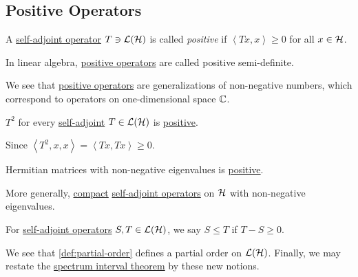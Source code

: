 \subsection{Positive Operators}
\begin{definition}\label{def:positive-op}
	A \hyperref[def:self-adjoint-op]{self-adjoint operator} \(T\ni \mathcal{\MakeUppercase{l}} (\mathcal{\MakeUppercase{h}} )\) is called \emph{positive} if \(\left\langle Tx, x \right\rangle \geq 0\) for all \(x\in \mathcal{\MakeUppercase{H}} \).
\end{definition}

\begin{remark}
	In linear algebra, \hyperref[def:positive-op]{positive operators} are called positive semi-definite.
\end{remark}

We see that \hyperref[def:positive-op]{positive operators} are generalizations of non-negative numbers, which correspond to operators on one-dimensional space \(\mathbb{\MakeUppercase{c}} \).

\begin{eg}
	\(T^2\) for every \hyperref[def:self-adjoint-op]{self-adjoint} \(T\in \mathcal{\MakeUppercase{l}} (\mathcal{\MakeUppercase{h}} )\) is \hyperref[def:positive-op]{positive}.
\end{eg}
\begin{explanation}
	Since \(\left\langle T^2, x, x \right\rangle = \left\langle Tx, Tx \right\rangle \geq 0\).
\end{explanation}

\begin{eg}
	Hermitian matrices with non-negative eigenvalues is \hyperref[def:positive-op]{positive}.
\end{eg}

\begin{eg}
	More generally, \hyperref[def:compact-op]{compact} \hyperref[def:self-adjoint-op]{self-adjoint operators} on \(\mathcal{\MakeUppercase{h}} \) with non-negative eigenvalues.
\end{eg}

\begin{definition}\label{def:partial-order}
	For \hyperref[def:self-adjoint-op]{self-adjoint operators} \(S, T\in \mathcal{\MakeUppercase{l}} (\mathcal{\MakeUppercase{h}} )\), we say \(S \leq T\) if \(T - S \geq 0\).
\end{definition}

We see that \autoref{def:partial-order} defines a partial order on \(\mathcal{\MakeUppercase{l}} (\mathcal{\MakeUppercase{h}} )\). Finally, we may restate the \hyperref[thm:spectrum-interval]{spectrum interval theorem} by these new notions.

